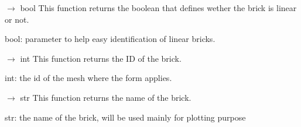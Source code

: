 \documentclass[letterpaper,10pt,english]{sphinxmanual}
\begin{document}
\begin{fulllineitems}
\begin{fulllineitems}
\begin{description}
\end{description}

\end{fulllineitems}


\begin{fulllineitems}
\label{\detokenize{scrimp:scrimp.brick.Brick.get_linear}}
\pysigstartsignatures
\pysiglinewithargsret
{}
{}
{{ $\rightarrow$ bool}}
\pysigstopsignatures
\sphinxAtStartPar
This function returns the boolean that defines wether the brick is linear or not.
\begin{description}
\sphinxAtStartPar
bool: parameter to help easy identification of linear bricks.

\end{description}

\end{fulllineitems}


\begin{fulllineitems}
\label{\detokenize{scrimp:scrimp.brick.Brick.get_mesh_id}}
\pysigstartsignatures
\pysiglinewithargsret
{}
{}
{{ $\rightarrow$ int}}
\pysigstopsignatures
\sphinxAtStartPar
This function returns the ID of the brick.
\begin{description}
\sphinxAtStartPar
int: the id of the mesh where the form applies.

\end{description}

\end{fulllineitems}


\begin{fulllineitems}
\label{\detokenize{scrimp:scrimp.brick.Brick.get_name}}
\pysigstartsignatures
\pysiglinewithargsret
{}
{}
{{ $\rightarrow$ str}}
\pysigstopsignatures
\sphinxAtStartPar
This function returns the name of the brick.
\begin{description}
\sphinxAtStartPar
str: the name of the brick, will be used mainly for plotting purpose


\end{description}
\end{fulllineitems}
\end{fulllineitems}
\end{document}
